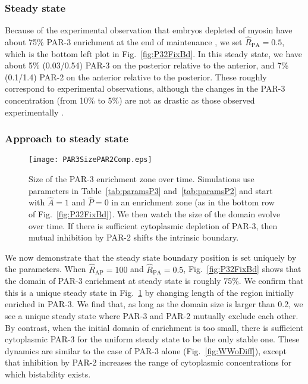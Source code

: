 \documentclass[11pt]{article}
\newcommand{\6}[1]{#1_{\text{6}}}
\newcommand{\3}[1]{#1_{\text{3}}}
\begin{document}
\subsubsection{Steady state}
Because of the experimental observation that embryos depleted of myosin have about 75\% PAR-3 enrichment at the end of maintenance \cite[Fig.~5B]{zonies2010symmetry}, we set $\hat R_\text{PA}=0.5$, which is the bottom left plot in Fig.\ \ref{fig:P32FixBd}. In this steady state, we have about 5\% (0.03/0.54) PAR-3 on the posterior relative to the anterior, and 7\% (0.1/1.4) PAR-2 on the anterior relative to the posterior. These roughly correspond to experimental observations, although the changes in the PAR-3 concentration (from 10\% to 5\%) are not as drastic as those observed experimentally \cite[Fig.~4C]{sailer2015dynamic}.

\subsubsection{Approach to steady state}

\begin{figure}
\centering
\texttt{[image: PAR3SizePAR2Comp.eps]}
\caption{\label{fig:P32FixBdEq}Size of the PAR-3 enrichment zone over time. Simulations use parameters in Table\ \ref{tab:paramsP3} and\ \ref{tab:paramsP2} and start with $\hat A=1$ and $\hat P=0$ in an enrichment zone (as in the bottom row of Fig.\ \ref{fig:P32FixBd}). We then watch the size of the domain evolve over time. If there is sufficient cytoplasmic depletion of PAR-3, then mutual inhibition by PAR-2 shifts the intrinsic boundary.}
\end{figure}

We now demonstrate that the steady state boundary position is set uniquely by the parameters. When $\hat R_\text{AP}=100$ and $\hat R_\text{PA}=0.5$, Fig.\ \ref{fig:P32FixBd} shows that the domain of PAR-3 enrichment at steady state is roughly 75\%. We confirm that this is a unique steady state in Fig.\ \ref{fig:P32FixBdEq} by changing length of the region initially enriched in PAR-3. We find that, as long as the domain size is larger than 0.2, we see a unique steady state where PAR-3 and PAR-2 mutually exclude each other. By contrast, when the initial domain of enrichment is too small, there is sufficient cytoplasmic PAR-3 for the uniform steady state to be the only stable one. These dynamics are similar to the case of PAR-3 alone (Fig.\ \ref{fig:WWoDiff}), except that inhibition by PAR-2 increases the range of cytoplasmic concentrations for which bistability exists. 
\end{document}
